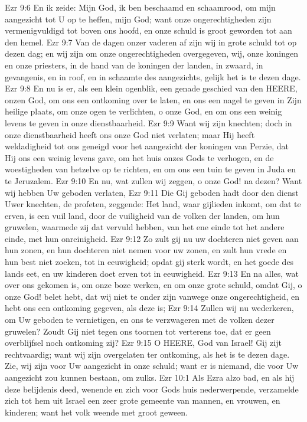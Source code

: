 Ezr 9:6  En ik zeide: Mijn God, ik ben beschaamd en schaamrood, om mijn aangezicht tot U op te heffen, mijn God; want onze ongerechtigheden zijn vermenigvuldigd tot boven ons hoofd, en onze schuld is groot geworden tot aan den hemel.
Ezr 9:7  Van de dagen onzer vaderen af zijn wij in grote schuld tot op dezen dag; en wij zijn om onze ongerechtigheden overgegeven, wij, onze koningen en onze priesters, in de hand van de koningen der landen, in zwaard, in gevangenis, en in roof, en in schaamte des aangezichts, gelijk het is te dezen dage.
Ezr 9:8  En nu is er, als een klein ogenblik, een genade geschied van den HEERE, onzen God, om ons een ontkoming over te laten, en ons een nagel te geven in Zijn heilige plaats, om onze ogen te verlichten, o onze God, en om ons een weinig levens te geven in onze dienstbaarheid.
Ezr 9:9  Want wij zijn knechten; doch in onze dienstbaarheid heeft ons onze God niet verlaten; maar Hij heeft weldadigheid tot ons geneigd voor het aangezicht der koningen van Perzie, dat Hij ons een weinig levens gave, om het huis onzes Gods te verhogen, en de woestigheden van hetzelve op te richten, en om ons een tuin te geven in Juda en te Jeruzalem.
Ezr 9:10  En nu, wat zullen wij zeggen, o onze God! na dezen? Want wij hebben Uw geboden verlaten,
Ezr 9:11  Die Gij geboden hadt door den dienst Uwer knechten, de profeten, zeggende: Het land, waar gijlieden inkomt, om dat te erven, is een vuil land, door de vuiligheid van de volken der landen, om hun gruwelen, waarmede zij dat vervuld hebben, van het ene einde tot het andere einde, met hun onreinigheid.
Ezr 9:12  Zo zult gij nu uw dochteren niet geven aan hun zonen, en hun dochteren niet nemen voor uw zonen, en zult hun vrede en hun best niet zoeken, tot in eeuwigheid; opdat gij sterk wordt, en het goede des lands eet, en uw kinderen doet erven tot in eeuwigheid.
Ezr 9:13  En na alles, wat over ons gekomen is, om onze boze werken, en om onze grote schuld, omdat Gij, o onze God! belet hebt, dat wij niet te onder zijn vanwege onze ongerechtigheid, en hebt ons een ontkoming gegeven, als deze is;
Ezr 9:14  Zullen wij nu wederkeren, om Uw geboden te vernietigen, en ons te verzwageren met de volken dezer gruwelen? Zoudt Gij niet tegen ons toornen tot verterens toe, dat er geen overblijfsel noch ontkoming zij?
Ezr 9:15  O HEERE, God van Israel! Gij zijt rechtvaardig; want wij zijn overgelaten ter ontkoming, als het is te dezen dage. Zie, wij zijn voor Uw aangezicht in onze schuld; want er is niemand, die voor Uw aangezicht zou kunnen bestaan, om zulks.
Ezr 10:1  Als Ezra alzo bad, en als hij deze belijdenis deed, wenende en zich voor Gods huis nederwerpende, verzamelde zich tot hem uit Israel een zeer grote gemeente van mannen, en vrouwen, en kinderen; want het volk weende met groot geween.
